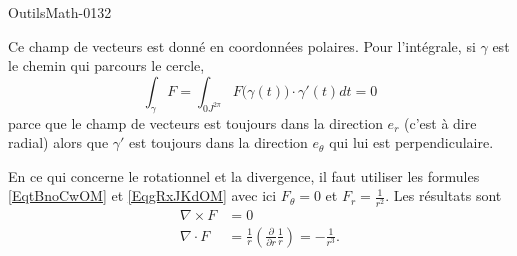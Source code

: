 
\begin{corrige}{OutilsMath-0132}

    Ce champ de vecteurs est donné en coordonnées polaires. Pour l'intégrale, si \( \gamma\) est le chemin qui parcours le cercle,
    \begin{equation}
        \int_{\gamma}F=\int_{0J^{2\pi}}F\big( \gamma(t) \big)\cdot \gamma'(t)dt=0
    \end{equation}
    parce que le champ de vecteurs est toujours dans la direction \( e_r\) (c'est à dire radial) alors que \( \gamma'\) est toujours dans la direction \( e_{\theta}\) qui lui est perpendiculaire.

    En ce qui concerne le rotationnel et la divergence, il faut utiliser les formules \eqref{EqtBnoCwOM} et \eqref{EqgRxJKdOM} avec ici \( F_{\theta}=0\) et \( F_r=\frac{1}{ r^2 }\). Les résultats sont
    \begin{subequations}
        \begin{align}
            \nabla\times F&=0\\
            \nabla\cdot F&=\frac{1}{ r }\left( \frac{ \partial  }{ \partial r }\frac{1}{ r } \right)=-\frac{1}{ r^3 }.
        \end{align}
    \end{subequations}

\end{corrige}
